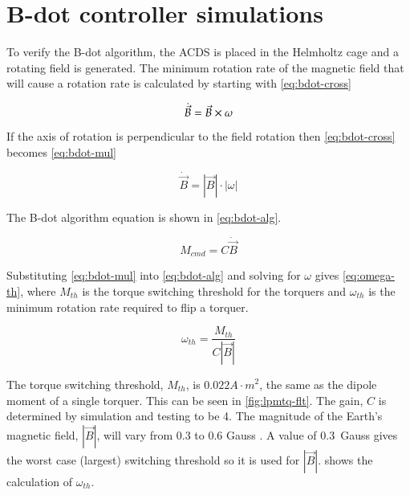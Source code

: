 
\section{B-dot controller simulations}

To verify the B-dot algorithm, the \ac{ACDS} is placed in the Helmholtz cage and a rotating field is generated. The minimum rotation rate of the magnetic field that will cause a rotation rate is calculated by starting with \cref{eq:bdot-cross}

\begin{equation}
    \dot{\vec{B}} = \vec{B} \times \omega
    \label{eq:bdot-cross}
\end{equation}

If the axis of rotation is perpendicular to the field rotation then \cref{eq:bdot-cross} becomes \cref{eq:bdot-mul}

\begin{equation}
    \dot{\vec{B}} = \left| \vec{B} \right| \cdot \left| \omega \right|
    \label{eq:bdot-mul}
\end{equation}

The B-dot algorithm equation is shown in \cref{eq:bdot-alg}.

\begin{equation}
    M_{cmd} = C \dot{\vec{B}} 
    \label{eq:bdot-alg}
\end{equation}

Substituting \cref{eq:bdot-mul} into \cref{eq:bdot-alg} and solving for $\omega$ gives \cref{eq:omega-th}, where $M_{th}$ is the torque switching threshold for the torquers and $\omega_{th}$ is the minimum rotation rate required to flip a torquer.

\begin{equation}
    \omega _ {th} = \frac{M _ {th}}{C \left| \vec{B} \right|}
    \label{eq:omega-th}
\end{equation}

The torque switching threshold, $M_{th}$, is $0.022 \unit{A \cdot m} ^2$, the same as the dipole moment of a single torquer. This can be seen in \cref{fig:lpmtq-flt}. The gain, $C$ is determined by simulation and testing to be 4. The magnitude of the Earth's magnetic field, ${\left| \vec{B} \right|}$, will vary from 0.3 to 0.6 Gauss \cite[pp.~114]{Wertz}. A value of 0.3~Gauss gives the worst case (largest) switching threshold so it is used for ${\left| \vec{B} \right|}$.  shows the calculation of $\omega_{th}$.

